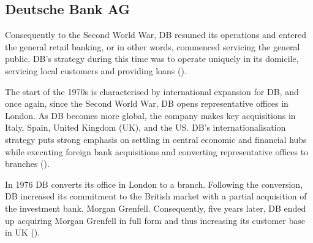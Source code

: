 \documentclass[11pt,a4paper]{article}
\begin{document}
{{\subsection{Deutsche Bank AG}
\vspace{-1mm}
 \par
Consequently to the Second World War, DB resumed its operations and entered the general retail banking, or in other words, commenced servicing the general public. DB's strategy during this time was to operate uniquely in its domicile, servicing local customers and providing loans (\cite{kobrakBankingGlobalMarkets2008}).  \par
The start of the 1970s  is characterised by international expansion for DB, and once again, since the Second World War, DB opens representative offices in London. As DB becomes more global, the company makes key acquisitions in Italy, Spain, United Kingdom (UK), and the US. DB's internationalisation strategy puts strong emphasis on settling in central economic and financial hubs while executing foreign bank acquisitions and converting representative offices to branches (\cite{InternationalizationDeutscheBank}). \par
In 1976 DB converts its office in London to a branch. Following the conversion, DB increased its commitment to the British market with a partial acquisition of the investment bank, Morgan Grenfell. Consequently, five years later, DB ended up acquiring Morgan Grenfell in full form and thus increasing its customer base in UK (\cite{deutschebankagDeutscheBankUnited}). \par %
}}
\end{document}
